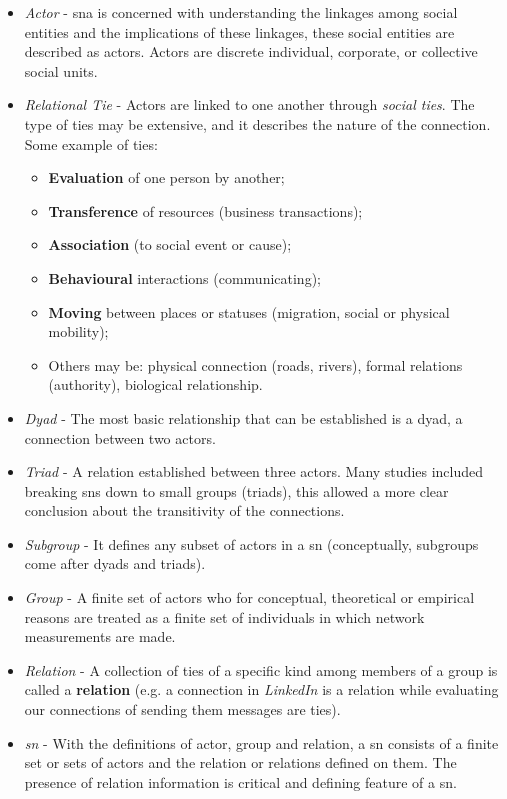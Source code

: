 \begin{itemize}
    \item \emph{Actor} - \gls{sna} is concerned with understanding the linkages among social entities and the implications of these linkages, these social entities are described as actors. Actors are  discrete individual, corporate, or collective social units.
    \item \emph{Relational Tie} - Actors are linked to one another through \textit{social ties}. The type of ties may be extensive, and it describes the nature of the connection. Some example of ties:
        \begin{itemize}
            \item \textbf{Evaluation} of one person by another;
            \item \textbf{Transference} of resources (business transactions);
            \item \textbf{Association} (to social event or cause);
            \item \textbf{Behavioural} interactions (communicating);
            \item \textbf{Moving} between places or statuses (migration, social or physical mobility);
            \item Others may be: physical connection (roads, rivers), formal relations (authority), biological relationship.
        \end{itemize}
    \item \emph{Dyad} - The most basic relationship that can be established is a dyad, a connection between two actors.
    \item \emph{Triad} - A relation established between three actors. Many studies included breaking \glspl{sn} down to small groups (triads), this allowed a more clear conclusion about the transitivity of the connections.
    \item \emph{Subgroup} - It defines any subset of actors in a \gls{sn} (conceptually, subgroups come after dyads and triads).
    \item \emph{Group} - A finite set of actors who for conceptual, theoretical or empirical reasons are treated as a finite set of individuals in which network measurements are made.
    \item \emph{Relation} - A collection of ties of a specific kind among members of a group is called a \textbf{relation} (e.g. a connection in \textit{LinkedIn} is a relation while evaluating our connections of sending them messages are ties).
    \item \emph{\gls{sn}} - With the definitions of actor, group and relation, a \gls{sn} consists of a finite set or sets of actors and the relation or relations defined on them. The presence of relation information is critical and defining feature of a \gls{sn}.
\end{itemize}


